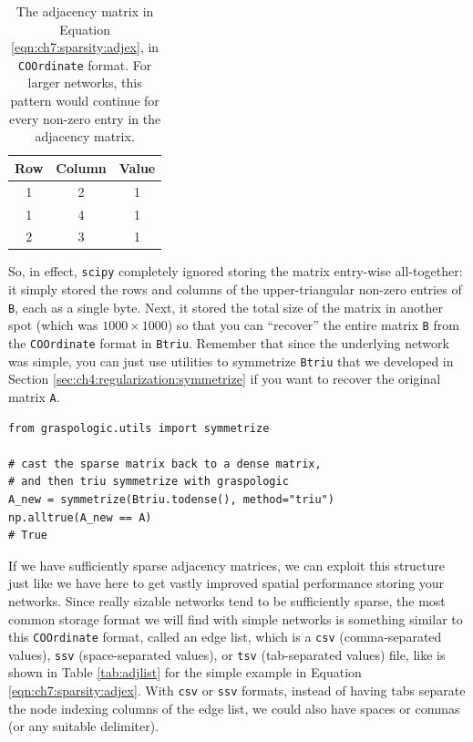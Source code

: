 \begin{table}[h]
    \centering
    \begin{tabular}{c|c| c}
        Row & Column & Value \\
        \hline
         1 & 2 & 1\\
         1 & 4 &  1 \\
         2 & 3 &  1
    \end{tabular}
    \caption[\texttt{COOrdinate format} for sparse matrices]{The adjacency matrix in Equation \eqref{eqn:ch7:sparsity:adjex}, in \texttt{COOrdinate} format. For larger networks, this pattern would continue for every non-zero entry in the adjacency matrix.}
    \label{tab:coordfmt}
\end{table}

So, in effect, \texttt{scipy} completely ignored storing the matrix entry-wise all-together: it simply stored the rows and columns of the upper-triangular non-zero entries of \texttt{B}, each as a single byte. Next, it stored the total size of the matrix in another spot (which was $1000 \times 1000$) so that you can ``recover'' the entire matrix \texttt{B} from the \texttt{COOrdinate} format in \texttt{Btriu}. Remember that since the underlying network was simple, you can just use utilities to symmetrize \texttt{Btriu} that we developed in Section \ref{sec:ch4:regularization:symmetrize} if you want to recover the original matrix \texttt{A}.

\begin{lstlisting}[style=python]
from graspologic.utils import symmetrize

# cast the sparse matrix back to a dense matrix,
# and then triu symmetrize with graspologic
A_new = symmetrize(Btriu.todense(), method="triu")
np.alltrue(A_new == A)
# True
\end{lstlisting}
If we have sufficiently sparse adjacency matrices, we can exploit this structure just like we have here to get vastly improved spatial performance storing your networks. Since really sizable networks tend to be sufficiently sparse, the most common storage format we will find with simple networks is something similar to this \texttt{COOrdinate} format, called an edge list, which is a \texttt{csv} (comma-separated values), \texttt{ssv} (space-separated values), or \texttt{tsv} (tab-separated values) file, like is shown in Table \ref{tab:adjlist} for the simple example in Equation \eqref{eqn:ch7:sparsity:adjex}. With \texttt{csv} or \texttt{ssv} formats, instead of having tabs separate the node indexing columns of the edge list, we could also have spaces or commas (or any suitable delimiter). 

